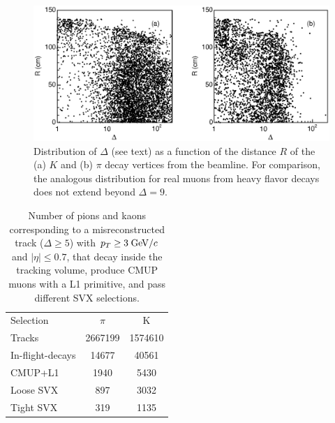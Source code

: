 \documentclass[aps,prd,preprint,floatfix,nofootinbib,superscriptaddress,showpacs,amssymb]{revtex4}
\begin{document}
 \begin{figure}[]
 \begin{center}
 \vspace{-0.2in}
 \leavevmode
 \includegraphics*[width=\textwidth]{fake_1.eps}
 \caption[] {Distribution of $\Delta$ (see text) as a function of the
             distance $R$ of the (a) $K$ and (b) $\pi$ decay vertices
             from the beamline. For comparison, the analogous distribution
             for real muons from heavy flavor decays does not extend beyond
             $\Delta=9$. } 
 \label{fig:fake_1}
 \end{center}
 \end{figure}
 \begin{table}
 \caption[]{Number of pions and kaons corresponding to a misreconstructed
            track ($\Delta \geq 5$) with $p_T \geq 3 \; {\rm GeV/}c$ and 
            $|\eta| \leq 0.7$, that decay inside the tracking volume,
            produce CMUP muons with a L1 primitive, and pass different SVX
            selections.}
 \begin{center}
 \begin{ruledtabular}
 \begin{tabular}{lcc}
  Selection        &   $\pi$   &    K    \\
  Tracks           &  2667199  & 1574610 \\ 
  In-flight-decays &    14677  &   40561 \\
  CMUP+L1          &     1940  &    5430 \\
  Loose SVX        &      897  &    3032 \\
  Tight SVX        &      319  &    1135 \\    
 \end{tabular}
 \end{ruledtabular}
 \end{center}
 \label{tab:tab_2bis}
 \end{table}
\end{document}
